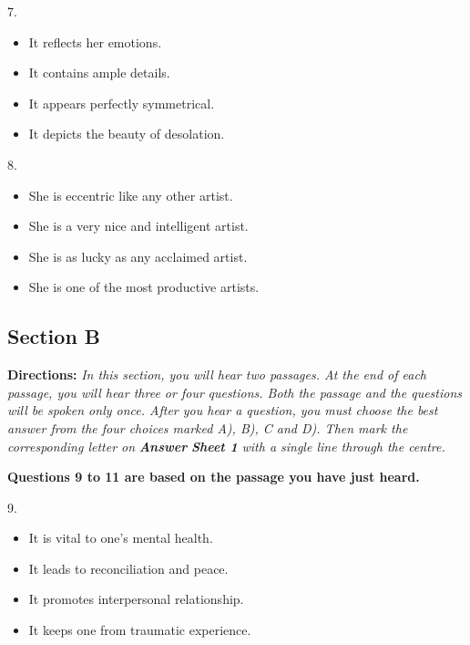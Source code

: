 \documentclass[UTF8,11pt]{ctexart}
\begin{document}
7.


\begin{itemize}[leftmargin=2em,itemsep=.2em,topsep=.4em]\item[A.] It reflects her emotions.
\item[B.] It contains ample details.
\item[C.] It appears perfectly symmetrical.
\item[D.] It depicts the beauty of desolation.
\end{itemize}

8.


\begin{itemize}[leftmargin=2em,itemsep=.2em,topsep=.4em]\item[A.] She is eccentric like any other artist.
\item[B.] She is a very nice and intelligent artist.
\item[C.] She is as lucky as any acclaimed artist.
\item[D.] She is one of the most productive artists.
\end{itemize}

\subsection*{\textbf{Section B}}


\textbf{Directions:} \textit{In this section, you will hear two passages. At the end of each passage, you will hear three or four} \textit{questions. Both the passage and the questions will be spoken only once. After you hear a question, you must choose} \textit{the best answer from the four choices marked A), B), C and D). Then mark the corresponding letter on }\textbf{\textit{Answer}} \textbf{\textit{Sheet 1}}\textit{ with a single line through the centre.}


\textbf{Questions 9 to 11 are based on the passage you have just heard.}


9.


\begin{itemize}[leftmargin=2em,itemsep=.2em,topsep=.4em]\item[A.] It is vital to one’s mental health.
\item[B.] It leads to reconciliation and peace.
\item[C.] It promotes interpersonal relationship.
\item[D.] It keeps one from traumatic experience.
\end{itemize}
\end{document}
